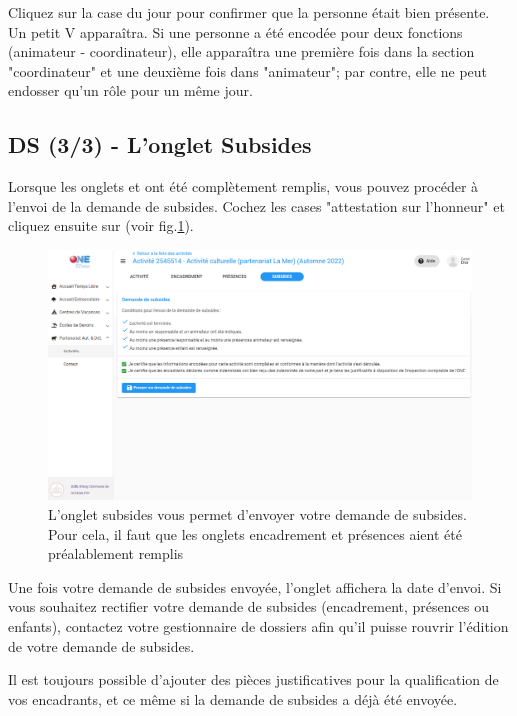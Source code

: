 \begin{tcolorbox}[title=Comment encoder les présences des encadrants ?]
Cliquez sur la case du jour pour confirmer que la personne était bien présente. Un petit {\color{bleu}V} apparaîtra. Si une personne a été encodée pour deux fonctions (animateur - coordinateur), elle apparaîtra une première fois dans la section "coordinateur" et une deuxième fois dans "animateur"; par contre, elle ne peut endosser qu'un rôle pour un même jour. 
\end{tcolorbox}


\subsection{DS (3/3) - L'onglet Subsides}
Lorsque les onglets  et  ont été complètement remplis, vous pouvez procéder à l'envoi de la demande de subsides. Cochez les cases "attestation sur l'honneur" et cliquez ensuite sur  (voir fig.\ref{fig:pad_subsides}). 

\begin{figure}[h!]
    \centering
    \includegraphics[width=15.5cm]{Images/pad/onglet-subsides.png}
    \caption{L'onglet subsides vous permet d'envoyer votre demande de subsides. Pour cela, il faut que les onglets encadrement et présences aient été préalablement remplis}
    \label{fig:pad_subsides}
\end{figure}



Une fois votre demande de subsides envoyée, l'onglet  affichera la date d'envoi. Si vous souhaitez rectifier votre demande de subsides (encadrement, présences ou enfants), contactez votre gestionnaire de dossiers afin qu'il puisse rouvrir l'édition de votre demande de subsides. 

\begin{information}
Il est toujours possible d'ajouter des pièces justificatives pour la qualification de vos encadrants, et ce même si la demande de subsides a déjà été envoyée.
\end{information}





